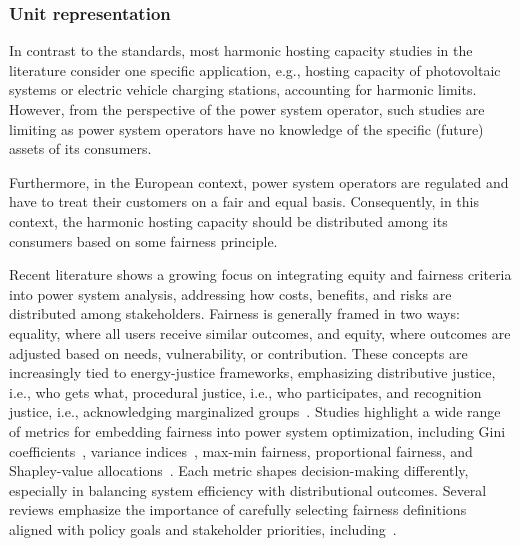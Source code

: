 
\subsubsection{Unit representation} 
\label{sec:unit_representation}

In contrast to the standards, most harmonic hosting capacity studies in the literature consider one specific application, e.g., hosting capacity of photovoltaic systems or electric vehicle charging stations, accounting for harmonic limits. However, from the perspective of the power system operator, such studies are limiting as power system operators have no knowledge of the specific (future) assets of its consumers. 

Furthermore, in the European context, power system operators are regulated and have to treat their customers on a fair and equal basis. Consequently, in this context, the harmonic hosting capacity should be distributed among its consumers based on some fairness principle.

Recent literature shows a growing focus on integrating equity and fairness criteria into power system analysis, addressing how costs, benefits, and risks are distributed among stakeholders. Fairness is generally framed in two ways: equality, where all users receive similar outcomes, and equity, where outcomes are adjusted based on needs, vulnerability, or contribution. These concepts are increasingly tied to energy-justice frameworks, emphasizing distributive justice, i.e., who gets what, procedural justice, i.e., who participates, and recognition justice, i.e., acknowledging marginalized groups~\cite{goforth_incorporating_2025}. Studies highlight a wide range of metrics for embedding fairness into power system optimization, including Gini coefficients~\cite{sun_gini_2020}, variance indices~\cite{heylen_fairness_2019}, max-min fairness, proportional fairness, and Shapley-value allocations~\cite{obrien_shapley_2015}. Each metric shapes decision-making differently, especially in balancing system efficiency with distributional outcomes. Several reviews emphasize the importance of carefully selecting fairness definitions aligned with policy goals and stakeholder priorities, including~\cite{goforth_incorporating_2025}.

